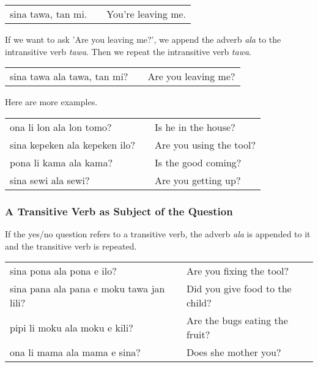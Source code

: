\begin{supertabular}{p{5,5cm}|ll}
    sina tawa, tan mi. &  & You're leaving me. \\
\end{supertabular}

If we want to ask 'Are you leaving me?', we append the adverb \textit{ala} to the intransitive verb \textit{tawa}.
Then we repeat the intransitive verb \textit{tawa}.

\begin{supertabular}{p{5,5cm}|ll}
    sina tawa ala tawa, tan mi? &  & Are you leaving me? \\
\end{supertabular}

Here are more examples.

\begin{supertabular}{p{5,5cm}|ll}
    ona li lon ala lon tomo?      &  & Is he in the house?     \\
    sina kepeken ala kepeken ilo? &  & Are you using the tool? \\
    pona li kama ala kama?        &  & Is the good coming?     \\
    sina sewi ala sewi?           &  & Are you getting up?     \\
\end{supertabular}

%
\subsubsection*{A Transitive Verb as Subject of the Question}
%

If the yes/no question refers to a transitive verb, the adverb \textit{ala} is appended to it and the transitive verb is repeated.

\begin{supertabular}{p{5,5cm}|ll}
    sina pona ala pona e ilo?                &  & Are you fixing the tool?        \\
    sina pana ala pana e moku tawa jan lili? &  & Did you give food to the child? \\
    pipi li moku ala moku e kili?            &  & Are the bugs eating the fruit?  \\
    ona li mama ala mama e sina?             &  & Does she mother you?            \\
\end{supertabular}

